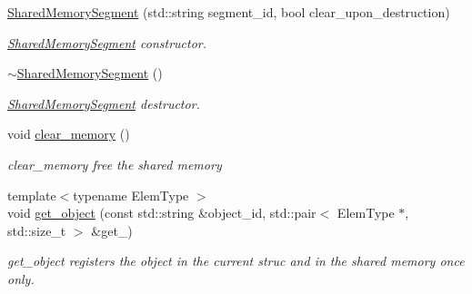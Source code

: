 \begin{DoxyCompactItemize}
\item 
\mbox{\label{classshared__memory_1_1SharedMemorySegment_ae984411227bd175e684f90c9c28c976c}} 
\hyperlink{classshared__memory_1_1SharedMemorySegment_ae984411227bd175e684f90c9c28c976c}{Shared\+Memory\+Segment} (std\+::string segment\+\_\+id, bool clear\+\_\+upon\+\_\+destruction)
\begin{DoxyCompactList}\small\item\em \hyperlink{classshared__memory_1_1SharedMemorySegment}{Shared\+Memory\+Segment} constructor. \end{DoxyCompactList}\item 
\mbox{\label{classshared__memory_1_1SharedMemorySegment_a9f02fd9f35950df5f6ce7ceaba5fbb53}} 
\hyperlink{classshared__memory_1_1SharedMemorySegment_a9f02fd9f35950df5f6ce7ceaba5fbb53}{$\sim$\+Shared\+Memory\+Segment} ()
\begin{DoxyCompactList}\small\item\em \hyperlink{classshared__memory_1_1SharedMemorySegment}{Shared\+Memory\+Segment} destructor. \end{DoxyCompactList}\item 
\mbox{\label{classshared__memory_1_1SharedMemorySegment_a0224739cd729dfb249c3d7882463e5eb}} 
void \hyperlink{classshared__memory_1_1SharedMemorySegment_a0224739cd729dfb249c3d7882463e5eb}{clear\+\_\+memory} ()
\begin{DoxyCompactList}\small\item\em clear\+\_\+memory free the shared memory \end{DoxyCompactList}\item 
{\footnotesize template$<$typename Elem\+Type $>$ }\\void \hyperlink{classshared__memory_1_1SharedMemorySegment_ad73b5160f713c9a78e67c4b8590d8729}{get\+\_\+object} (const std\+::string \&object\+\_\+id, std\+::pair$<$ Elem\+Type $\ast$, std\+::size\+\_\+t $>$ \&get\+\_\+)
\begin{DoxyCompactList}\small\item\em get\+\_\+object registers the object in the current struc and in the shared memory once only. \end{DoxyCompactList}\item 

\end{DoxyCompactItemize}
